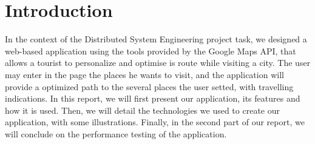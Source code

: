 \section{Introduction}

In the context of the Distributed System Engineering project task, we designed a web-based application using the tools provided by the Google Maps API, that allows a tourist to personalize and optimise is route while visiting a city. The user may enter in the page the places he wants to visit, and the application will provide a optimized path to the several places the user setted, with travelling indications. In this report, we will first present our application, its features and how it is used. Then, we will detail the technologies we used to create our application, with some illustrations. Finally, in the second part of our report, we will conclude on the performance testing of the application.
	